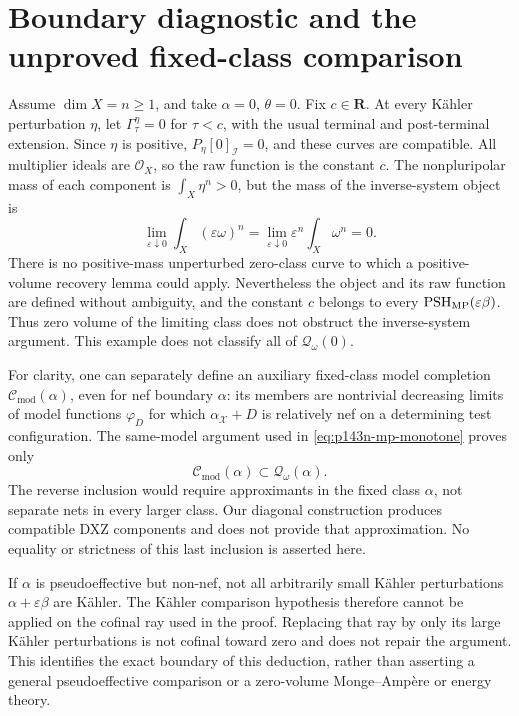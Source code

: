 \section{Boundary diagnostic and the unproved fixed-class comparison}

\begin{example}\label{ex:p143n-zero-class}
Assume \(\dim X=n\geq1\), and take \(\alpha=0\), \(\theta=0\).
Fix \(c\in\mathbf R\). At every K\"ahler perturbation \(\eta\),
let \(\Gamma^{\eta}_\tau=0\) for \(\tau<c\), with the usual
terminal and post-terminal extension. Since \(\eta\) is positive,
\(P_\eta[0]_{\mathcal I}=0\), and these curves are compatible.
All multiplier ideals are \(\mathcal O_X\), so the raw function is
the constant \(c\). The nonpluripolar mass of each component is
\(\int_X\eta^n>0\), but the mass of the inverse-system object is
\[
 \lim_{\varepsilon\downarrow0}
 \int_X(\varepsilon\omega)^n
 =\lim_{\varepsilon\downarrow0}
 \varepsilon^n\int_X\omega^n=0.
\]
There is no positive-mass unperturbed zero-class curve to which a
positive-volume recovery lemma could apply. Nevertheless the object
and its raw function are defined without ambiguity, and the constant
\(c\) belongs to every \(\operatorname{PSH}_{\mathrm{MP}}(\varepsilon\beta)\).
Thus zero volume of the limiting class does not obstruct the
inverse-system argument. This example does not classify all of
\(\mathcal Q_\omega(0)\).
\end{example}

For clarity, one can separately define an auxiliary fixed-class model
completion \(\mathcal C_{\mathrm{mod}}(\alpha)\), even for nef
boundary \(\alpha\): its members are nontrivial decreasing limits
of model functions \(\varphi_D\) for which
\(\alpha_{\mathcal X}+D\) is relatively nef on a determining
test configuration. The same-model argument used in
\eqref{eq:p143n-mp-monotone} proves only
\[
 \mathcal C_{\mathrm{mod}}(\alpha)
 \subset\mathcal Q_\omega(\alpha).
\]
The reverse inclusion would require approximants in the fixed class
\(\alpha\), not separate nets in every larger class. Our diagonal
construction produces compatible DXZ components and does not provide
that approximation. No equality or strictness of this last inclusion
is asserted here.

If \(\alpha\) is pseudoeffective but non-nef, not all arbitrarily
small K\"ahler perturbations \(\alpha+\varepsilon\beta\) are
K\"ahler. The K\"ahler comparison hypothesis therefore cannot be
applied on the cofinal ray used in the proof. Replacing that ray by
only its large K\"ahler perturbations is not cofinal toward zero
and does not repair the argument. This identifies the exact boundary
of this deduction, rather than asserting a general pseudoeffective
comparison or a zero-volume Monge--Amp\`ere or energy theory.
